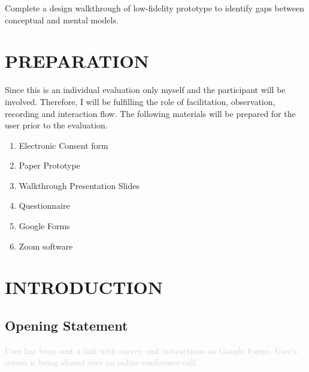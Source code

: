 





\maketitle
\begin{center}
Complete a design walkthrough of low-fidelity prototype to identify gaps between conceptual and mental models.
\end{center}

\section*{PREPARATION}
Since this is an individual evaluation only myself and the participant will be involved. Therefore, I will be fulfilling the role of facilitation, observation, recording and interaction flow. The following materials will be prepared for the user prior to the evaluation.

\begin{enumerate}
    \item Electronic Consent form
    \item Paper Prototype
    \item Walkthrough Presentation Slides
    \item Questionnaire
    \item Google Forms
    \item Zoom software
\end{enumerate}

\section*{INTRODUCTION}

    \subsection*{Opening Statement}

        \textcolor{lightgray}{User has been sent a link with survey and instructions on Google Forms. User’s screen is being shared over an online conference call.}

